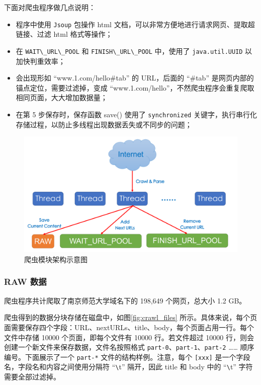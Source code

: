 \documentclass{ctexart}
\newcommand{\code}[1]{\colorbox{backcolor}{\lstinline|#1|}}
\begin{document}
    下面对爬虫程序做几点说明：

    \begin{itemize}
        \item 程序中使用 \code{Jsoup} 包操作 html 文档，可以非常方便地进行请求网页、提取超链接、过滤 html 格式等操作；
        \item 在 \code{WAIT\_URL\_POOL} 和 \code{FINISH\_URL\_POOL} 中，使用了 \code{java.util.UUID} 以加快判重效率；
        \item 会出现形如 “www.1.com/hello\#tab” 的 URL，后面的 “\#tab” 是网页内部的锚点定位，需要过滤掉，变成 “www.1.com/hello”，不然爬虫程序会重复爬取相同页面，大大增加数据量；
        \item 在第 5 步保存时，保存函数 save() 使用了 \code{synchronized} 关键字，执行串行化存储过程，以防止多线程出现数据丢失或不同步的问题；
    \end{itemize}

    \begin{figure}[t]
        \centering
        \includegraphics[width=\textwidth]{src/crawl}
        \caption{爬虫模块架构示意图}
        \label{fig:crawl}
    \end{figure}

    \subsubsection{RAW 数据}\label{subsubsec:crawl_data}

    爬虫程序共计爬取了南京师范大学域名下的 198,649 个网页，总大小 1.2 GB。

    爬虫得到的数据分块存储在磁盘中，如图\ref{fig:crawl_files} 所示。具体来说，每个页面需要保存四个字段：URL、nextURLs、title、body，每个页面占用一行。每个文件中存储 10000 个页面，即每个文件有 10000 行。若文件超过 10000 行，则会创建一个新文件来保存数据，文件名按照格式 \code{part-0}、\code{part-1}、\code{part-2} …… 顺序编号。下面展示了一个 \code{part-*} 文件的结构样例。注意，每个 \code{[xxx]} 是一个字段名，字段名和内容之间使用分隔符 “\verb|\|t” 隔开，因此 title 和 body 中的 “\verb|\|t” 字符需要全部过滤掉。
\end{document}
